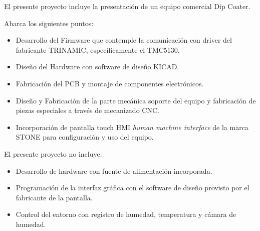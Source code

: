 El presente proyecto incluye la presentación de un equipo comercial Dip Coater. 

Abarca los siguientes puntos:

\begin{itemize}
\item Desarrollo del Firmware que contemple la comunicación con driver del fabricante TRINAMIC, específicamente el TMC5130.
\item Diseño del Hardware con software de diseño KICAD.
\item Fabricación del PCB y montaje de componentes electrónicos.
\item Diseño y Fabricación de la parte mecánica soporte del equipo y fabricación de piezas especiales a través de mecanizado CNC.
\item Incorporación de pantalla touch HMI \textit{human machine interface} de la marca STONE para configuración y uso del equipo.
\end{itemize}



El presente proyecto no incluye:

\begin{itemize}
\item Desarrollo de hardware con fuente de alimentación incorporada.
\item Programación de la interfaz gráfica con el software de diseño provisto por el fabricante de la pantalla.
\item Control del entorno con registro de humedad, temperatura y  cámara de humedad.
\end{itemize}



